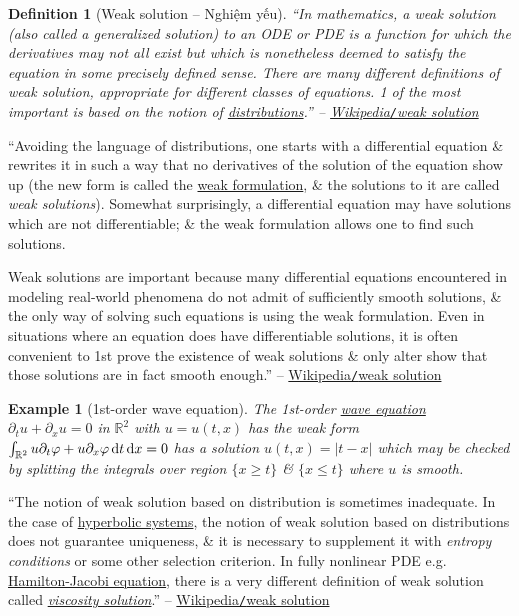 \documentclass{article}
\newtheorem{definition}{Definition}
\newtheorem{example}{Example}
\begin{document}
\begin{definition}[Weak solution -- Nghiệm yếu]
	``In mathematics, a \emph{weak solution} (also called a \emph{generalized solution}) to an ODE or PDE is a function for which the derivatives may not all exist but which is nonetheless deemed to satisfy the equation in some precisely defined sense. There are many different definitions of weak solution, appropriate for different classes of equations. 1 of the most important is based on the notion of \href{https://en.wikipedia.org/wiki/Distribution_(mathematics)}{distributions}.'' -- \href{https://en.wikipedia.org/wiki/Weak_solution}{Wikipedia{\tt/}weak solution}
\end{definition}
``Avoiding the language of distributions, one starts with a differential equation \& rewrites it in such a way that no derivatives of the solution of the equation show up (the new form is called the \href{https://en.wikipedia.org/wiki/Weak_formulation}{weak formulation}, \& the solutions to it are called {\it weak solutions}). Somewhat surprisingly, a differential equation may have solutions which are not differentiable; \& the weak formulation allows one to find such solutions.

Weak solutions are important because many differential equations encountered in modeling real-world phenomena do not admit of sufficiently smooth solutions, \& the only way of solving such equations is using the weak formulation. Even in situations where an equation does have differentiable solutions, it is often convenient to 1st prove the existence of weak solutions \& only alter show that those solutions are in fact smooth enough.'' -- \href{https://en.wikipedia.org/wiki/Weak_solution}{Wikipedia{\tt/}weak solution}

\begin{example}[1st-order wave equation]
	The 1st-order \href{https://en.wikipedia.org/wiki/Wave_equation}{wave equation} $\partial_tu + \partial_xu = 0$ in $\mathbb{R}^2$ with $u = u(t,x)$ has the weak form $\int_{\mathbb{R}^2} u\partial_t\varphi + u\partial_x\varphi\,{\rm d}t\,{\rm d}x = 0$ has a solution $u(t,x) = |t - x|$ which may be checked by splitting the integrals over region $\{x\ge t\}$ \& $\{x\le t\}$ where $u$ is smooth.
\end{example}
``The notion of weak solution based on distribution is sometimes inadequate. In the case of \href{https://en.wikipedia.org/wiki/Hyperbolic_system}{hyperbolic systems}, the notion of weak solution based on distributions does not guarantee uniqueness, \& it is necessary to supplement it with {\it entropy conditions} or some other selection criterion. In fully nonlinear PDE e.g. \href{https://en.wikipedia.org/wiki/Hamilton%E2%80%93Jacobi_equation}{Hamilton-Jacobi equation}, there is a very different definition of weak solution called \href{https://en.wikipedia.org/wiki/Viscosity_solution}{\it viscosity solution}.'' -- \href{https://en.wikipedia.org/wiki/Weak_solution}{Wikipedia{\tt/}weak solution}
\end{document}
